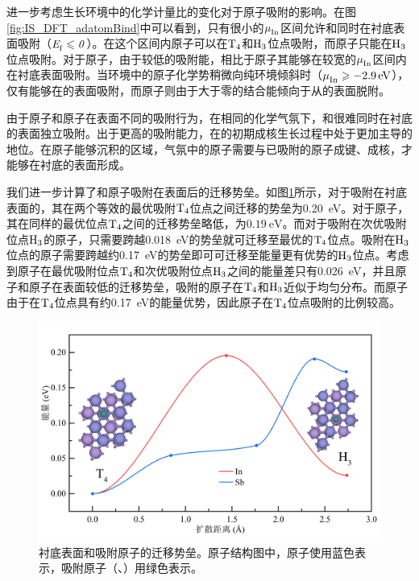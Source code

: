 进一步考虑生长环境中的化学计量比的变化对于原子吸附的影响。在图\ref{fig:IS_DFT_adatomBind}中可以看到，只有很小的$\it \mu_{\rm In}^{\rm } \it$区间允许和同时在衬底表面吸附（$\it E_{\rm f}^{\rm } \it \leqslant 0$）。在这个区间内原子可以在$\rm T_{4} \it$和$\rm H_{3} \it$位点吸附，而原子只能在$\rm H_{3} \it$位点吸附。对于原子，由于较低的吸附能，相比于原子其能够在较宽的$\it \mu_{\rm In}^{\rm } \it$区间内在衬底表面吸附。当环境中的原子化学势稍微向纯环境倾斜时（$\it \mu_{\rm In}^{\rm } \it\geqslant \SI{-2.9}{\electronvolt}$），仅有能够在的表面吸附，而原子则由于大于零的结合能倾向于从的表面脱附。

由于原子和原子在表面不同的吸附行为，在相同的化学气氛下，和很难同时在衬底的表面独立吸附。出于更高的吸附能力，在的初期成核生长过程中处于更加主导的地位。在原子能够沉积的区域，气氛中的原子需要与已吸附的原子成键、成核，才能够在衬底的表面形成。

我们进一步计算了和原子吸附在表面后的迁移势垒。如图\ref{fig:IS_DFT_adatomDiff}所示，对于吸附在衬底表面的，其在两个等效的最优吸附$\rm T_{4} \it$位点之间迁移的势垒为\SI{0.20}{\electronvolt}。对于原子，其在同样的最优位点$\rm T_{4} \it$之间的迁移势垒略低，为$\SI{0.19}{\electronvolt}$。而对于吸附在次优吸附位点$\rm H_{3} \it$的原子，只需要跨越\SI{0.018}{\electronvolt}的势垒就可迁移至最优的$\rm T_{4} \it$位点。吸附在$\rm H_{3} \it$位点的原子需要跨越约\SI{0.17}{\electronvolt}的势垒即可可迁移至能量更有优势的$\rm H_{3} \it$位点。考虑到原子在最优吸附位点$\rm T_{4} \it$和次优吸附位点$\rm H_{3} \it$之间的能量差只有\SI{0.026}{\electronvolt}，并且原子和原子在表面较低的迁移势垒，吸附的原子在$\rm T_{4} \it$和$\rm H_{3} \it$近似于均匀分布。而原子由于在$\rm T_{4} \it$位点具有约\SI{0.17}{\electronvolt}的能量优势，因此原子在$\rm T_{4} \it$位点吸附的比例较高。

\begin{figure}[htb]
    \includegraphics{pic/IS_DFT_adatomDiff.png}
    \caption{衬底表面和吸附原子的迁移势垒。原子结构图中，原子使用蓝色表示，吸附原子（、）用绿色表示。}
    \label{fig:IS_DFT_adatomDiff}
\end{figure}

